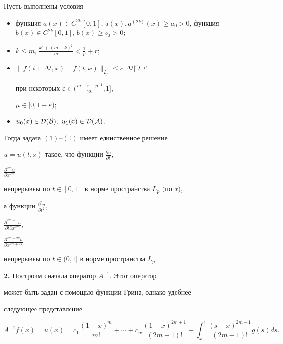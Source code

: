 \begin{thm} 


Пусть выполнены условия 


\begin{itemize} 


\item[$1^\circ$.] функция $a(x)\in C^{2k}[0,1]$, $a(x),a^{(2k)}(x)\ge 


a_0>0$, функция $b(x)\in C^{2k}[0,1]$, $b(x)\ge b_0>0;$ 


\item[$2^\circ$.] $k\le m$, $\frac{k^2+(m-k)^2}{m}<\frac{1}{p}+r;$ 


\item[$3^\circ$.] $\|f(t+\Delta t,x)-f(t,x)\|_{L_p}\le c|\Delta 


t|^\varepsilon t^{-\mu}$ 


при некоторых $\varepsilon\in\big(\frac{m-r-p^{-1}}{2k},1\big]$, 


$\mu\in[0,1-\varepsilon);$ 


\item[$4^\circ$.] $u_0(x)\in\cal D(B)$, $u_1(x)\in\cal D(A)$. 


\end{itemize} 


 


Тогда задача $(1)$--$(4)$ имеет единственное решение 


$u=u(t,x)$ такое, что функции $\frac{\partial u}{\partial t}$, 


$\frac{\partial^{2m}u}{\partial x^{2m}}$ 


непрерывны по $t\in[0,1]$ в норме пространства $L_p$ $($по $x)$, 


а функции $\frac{\partial^2u}{\partial t^2}$, 


$\frac{\partial^{2m+1}u}{\partial t\partial x^{2m}}$, 


$\frac{\partial^{2m+2k}u}{\partial x^{2m+2k}}$ 


непрерывны по $t\in(0,1]$ в норме пространства $L_p$. 


\end{thm} 


 


{\bf 2.} Построим сначала оператор $A^{-1}$. Этот оператор 


может быть задан с помощью функции Грина, однако удобнее  


следующее представление 


\begin{equation} 


A^{-1}f(x)=u(x)=c_1\frac{(1-x)^m}{m!}+\dotsb+ 


c_m\frac{(1-x)^{2m+1}}{(2m-1)!}+\int^1_x 


\frac{(s-x)^{2m-1}}{(2m-1)!}g(s)ds. 


\end{equation} 


